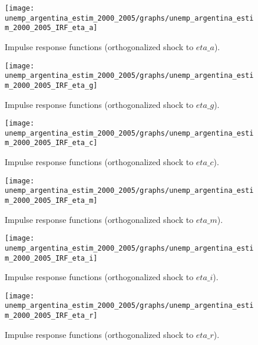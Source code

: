  
\begin{figure}[H]
\centering 
\texttt{[image: unemp\_argentina\_estim\_2000\_2005/graphs/unemp\_argentina\_estim\_2000\_2005\_IRF\_eta\_a]}
\caption{Impulse response functions (orthogonalized shock to $eta\_a$).}
\label{Fig:IRF:eta_a}
\end{figure}
 
\begin{figure}[H]
\centering 
\texttt{[image: unemp\_argentina\_estim\_2000\_2005/graphs/unemp\_argentina\_estim\_2000\_2005\_IRF\_eta\_g]}
\caption{Impulse response functions (orthogonalized shock to $eta\_g$).}
\label{Fig:IRF:eta_g}
\end{figure}
 
\begin{figure}[H]
\centering 
\texttt{[image: unemp\_argentina\_estim\_2000\_2005/graphs/unemp\_argentina\_estim\_2000\_2005\_IRF\_eta\_c]}
\caption{Impulse response functions (orthogonalized shock to $eta\_c$).}
\label{Fig:IRF:eta_c}
\end{figure}
 
\begin{figure}[H]
\centering 
\texttt{[image: unemp\_argentina\_estim\_2000\_2005/graphs/unemp\_argentina\_estim\_2000\_2005\_IRF\_eta\_m]}
\caption{Impulse response functions (orthogonalized shock to $eta\_m$).}
\label{Fig:IRF:eta_m}
\end{figure}
 
\begin{figure}[H]
\centering 
\texttt{[image: unemp\_argentina\_estim\_2000\_2005/graphs/unemp\_argentina\_estim\_2000\_2005\_IRF\_eta\_i]}
\caption{Impulse response functions (orthogonalized shock to $eta\_i$).}
\label{Fig:IRF:eta_i}
\end{figure}
 
\begin{figure}[H]
\centering 
\texttt{[image: unemp\_argentina\_estim\_2000\_2005/graphs/unemp\_argentina\_estim\_2000\_2005\_IRF\_eta\_r]}
\caption{Impulse response functions (orthogonalized shock to $eta\_r$).}
\label{Fig:IRF:eta_r}
\end{figure}
 
 
